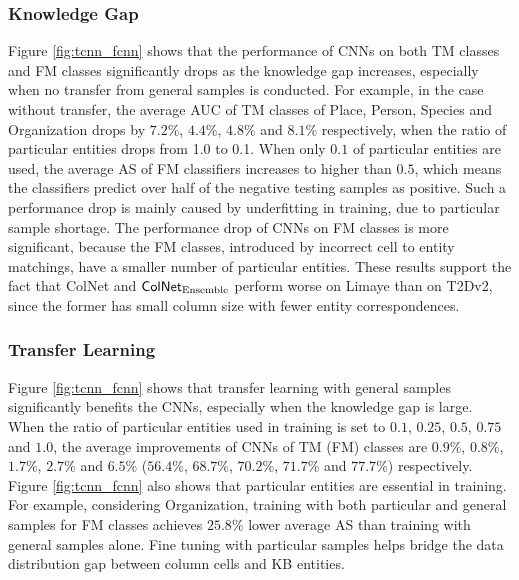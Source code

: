 \documentclass[letterpaper]{article}
\newcommand{\ernesto}[1]{{\color{black}#1}}
\newcommand{\rv}[1]{{\color{black}#1}}
\newcommand{\camera}[1]{{\color{black}#1}}
\newcommand{\ColNet}{\textsf{ColNet}\xspace}
\begin{document}
\subsubsection{Knowledge Gap}
Figure \ref{fig:tcnn_fcnn} 
\camera{shows}
that the performance of CNNs \camera{on} both TM classes and FM classes significantly drops as \rv{the knowledge gap increases,
especially when no transfer from general samples is conducted.}
For example,
in the case without transfer,
the average AUC of TM classes of Place, Person, Species and Organization drops by $7.2\%$, $4.4\%$, $4.8\%$ and $8.1\%$ respectively,
when \ernesto{the ratio of particular entities drops from 1.0 to 0.1}.
\rv{When only $0.1$ of particular entities are used,
the average AS of FM classifiers} increases to higher than $0.5$,
which means the classifiers predict over half of the negative testing samples as positive.
\rv{Such a performance drop is 
mainly caused by underfitting in training, due to particular sample shortage.}
The performance drop of CNNs \camera{on} FM classes is more significant,
\camera{because} the FM classes, 
introduced by incorrect cell to entity matchings, 
have a smaller number of particular entities.
These results \camera{support} the fact that \ColNet and $\text{\ColNet}_{\text{Ensemble}}$ perform worse on Limaye than on T2Dv2, \camera{since the} former has \camera{small} column size with fewer entity correspondences.

\subsubsection{Transfer Learning}\label{sec:transfer}

Figure \ref{fig:tcnn_fcnn} shows that transfer learning  with general samples significantly benefits the CNNs,
especially when the knowledge gap is large.
\rv{When the \ernesto{ratio} of particular entities used in training is set to $0.1$, $0.25$, $0.5$, $0.75$ and $1.0$,
the average improvements of CNNs of TM (FM) classes are $0.9\%$, $0.8\%$, $1.7\%$, $2.7\%$ and $6.5\%$
($56.4\%$, $68.7\%$, $70.2\%$, $71.7\%$ and $77.7\%$) respectively.
}
Figure \ref{fig:tcnn_fcnn} 
\camera{also shows}
that particular entities are essential in training.
For example, considering Organization,
training with both particular and general samples for FM classes achieves $25.8\%$ lower average AS than training with general samples alone.
\camera{Fine tuning} with particular samples helps bridge the data distribution gap between column cells and KB entities.
\end{document}
